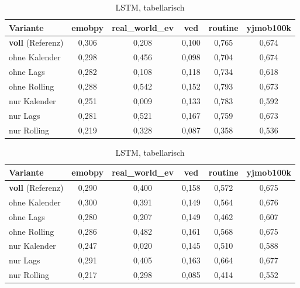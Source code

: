 \begin{table}[H]
    \begin{subtable}{\textwidth}
        \centering
        \caption{LightGBM}
        \label{tab:ablation_f1_lgbm}
        \begin{tabular}{lccccc}
            \toprule
            \textbf{Variante} & emobpy & real\_world\_ev & ved & routine & yjmob100k \\
            \midrule
            \textbf{voll} (Referenz)     & 0,306 & 0,208 & 0,100 & 0,765 & 0,674 \\
            \addlinespace
            ohne Kalender                & 0,298 & 0,456 & 0,098 & 0,704 & 0,674 \\
            ohne Lags                    & 0,282 & 0,108 & 0,118 & 0,734 & 0,618 \\
            ohne Rolling                 & 0,288 & 0,542 & 0,152 & 0,793 & 0,673 \\
            \addlinespace
            nur Kalender                 & 0,251 & 0,009 & 0,133 & 0,783 & 0,592 \\
            nur Lags                     & 0,281 & 0,521 & 0,167 & 0,759 & 0,673 \\
            nur Rolling                  & 0,219 & 0,328 & 0,087 & 0,358 & 0,536 \\
            \bottomrule
        \end{tabular}
    \end{subtable}

    \vspace{1em}

    \begin{subtable}{\textwidth}
        \centering
        \caption{LSTM, tabellarisch}
        \label{tab:ablation_f1_lstm_tab}
        \begin{tabular}{lccccc}
            \toprule
            \textbf{Variante} & emobpy & real\_world\_ev & ved & routine & yjmob100k \\
            \midrule
            \textbf{voll} (Referenz)     & 0,290 & 0,400 & 0,158 & 0,572 & 0,675 \\
            \addlinespace
            ohne Kalender                & 0,300 & 0,391 & 0,149 & 0,564 & 0,676 \\
            ohne Lags                    & 0,280 & 0,207 & 0,149 & 0,462 & 0,607 \\
            ohne Rolling                 & 0,286 & 0,482 & 0,161 & 0,568 & 0,675 \\
            \addlinespace
            nur Kalender                 & 0,247 & 0,020 & 0,145 & 0,510 & 0,588 \\
            nur Lags                     & 0,291 & 0,405 & 0,163 & 0,664 & 0,677 \\
            nur Rolling                  & 0,217 & 0,298 & 0,085 & 0,414 & 0,552 \\
            \bottomrule
        \end{tabular}
    \end{subtable}
\end{table}

